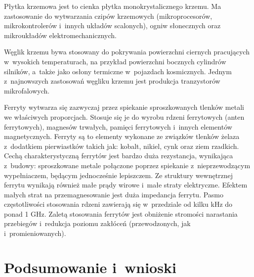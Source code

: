 Płytka krzemowa jest to cienka płytka monokrystalicznego krzemu. Ma zastosowanie  do wytwarzania czipów krzemowych (mikroprocesorów, mikrokontrolerów i~innych układów scalonych), ogniw słonecznych oraz mikroukładów elektromechanicznych.

Węglik krzemu bywa stosowany do pokrywania powierzchni ciernych pracujących w~wysokich temperaturach, na przykład powierzchni bocznych cylindrów silników, a~także jako osłony termiczne w~pojazdach kosmicznych. Jednym z~najnowszych zastosowań węgliku krzemu jest produkcja tranzystorów mikrofalowych.

Ferryty wytwarza się zazwyczaj przez spiekanie sproszkowanych tlenków metali we właściwych proporcjach. Stosuje się je do wyrobu rdzeni ferrytowych (anten ferrytowych), magnesów trwałych, pamięci ferrytowych i~innych elementów magnetycznych. Ferryty są to elementy wykonane ze związków tlenków żelaza z~dodatkiem pierwiastków takich jak: kobalt, nikiel, cynk oraz ziem rzadkich.
\newline
Cechą charakterystyczną ferrytów jest bardzo duża rezystancja, wynikająca z~budowy: sproszkowane metale połączone poprzez spiekanie z~nieprzewodzącym wypełniaczem, będącym jednocześnie lepiszczem. Ze struktury wewnętrznej ferrytu wynikają również małe prądy wirowe i~małe straty elektryczne. Efektem małych strat na przemagnesowanie jest duża impedancja ferrytu. Pasmo częstotliwości stosowania rdzeni zawierają się w~przedziale od kilku kHz do ponad 1 GHz. Zaletą stosowania ferrytów jest obniżenie stromości narastania przebiegów i~redukcja poziomu zakłóceń (przewodzonych, jak i~promieniowanych).

\section{Podsumowanie i~wnioski}

